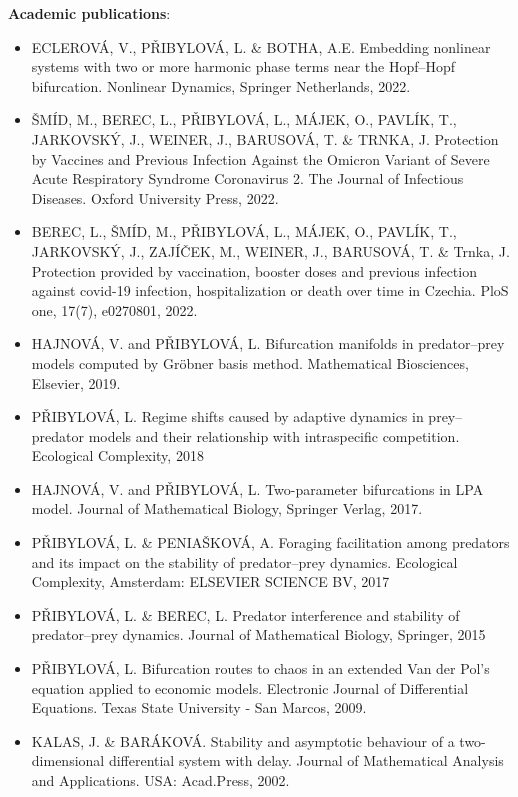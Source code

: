 \documentclass[a4paper,11pt]{scrartcl}
\begin{document}
\textbf{Academic publications}:
\begin{itemize}
    \item ECLEROVÁ, V., PŘIBYLOVÁ, L. \& BOTHA, A.E. Embedding nonlinear systems with two or more harmonic phase terms near the Hopf–Hopf bifurcation. Nonlinear Dynamics, Springer Netherlands, 2022.
    \item ŠMÍD, M., BEREC, L., PŘIBYLOVÁ, L., MÁJEK, O., PAVLÍK, T., JARKOVSKÝ, J., WEINER, J., BARUSOVÁ, T. \& TRNKA, J. Protection by Vaccines and Previous Infection Against the Omicron Variant of Severe Acute Respiratory Syndrome Coronavirus 2. The Journal of Infectious Diseases. Oxford University Press, 2022.
    \item BEREC, L., ŠMÍD, M., PŘIBYLOVÁ, L., MÁJEK, O., PAVLÍK, T., JARKOVSKÝ, J., ZAJÍČEK, M., WEINER, J., BARUSOVÁ, T. \& Trnka, J. Protection provided by vaccination, booster doses and previous infection against covid-19 infection, hospitalization or death over time in Czechia. PloS one, 17(7), e0270801, 2022.
    \item HAJNOVÁ, V. and PŘIBYLOVÁ, L. Bifurcation manifolds in predator–prey models computed by Gröbner basis method. Mathematical Biosciences, Elsevier, 2019.
    \item PŘIBYLOVÁ, L. Regime shifts caused by adaptive dynamics in prey–predator models and their relationship with intraspecific competition. Ecological Complexity, 2018
    \item HAJNOVÁ, V. and PŘIBYLOVÁ, L. Two-parameter bifurcations in LPA model. Journal of Mathematical Biology, Springer Verlag, 2017.
    \item PŘIBYLOVÁ, L. \& PENIAŠKOVÁ, A. Foraging facilitation among predators and its impact on the stability of predator–prey dynamics. Ecological Complexity, Amsterdam: ELSEVIER SCIENCE BV, 2017
    \item PŘIBYLOVÁ, L. \& BEREC, L. Predator interference and stability of predator–prey dynamics. Journal of Mathematical Biology, Springer, 2015
    \item PŘIBYLOVÁ, L. Bifurcation routes to chaos in an extended Van der Pol's equation applied to economic models. Electronic Journal of Differential Equations. Texas State University - San Marcos, 2009.
    \item KALAS, J. \& BARÁKOVÁ. Stability and asymptotic behaviour of a two-dimensional differential system with delay. Journal of Mathematical Analysis and Applications. USA: Acad.Press, 2002.
\end{itemize}


\end{document}
